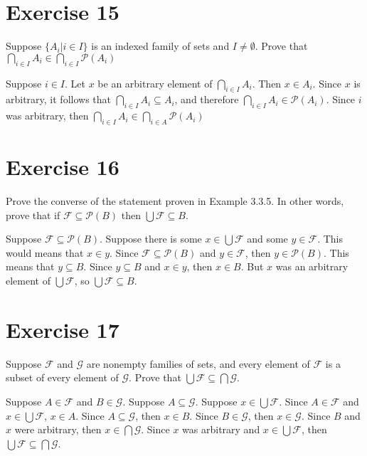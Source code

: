 \documentclass[11pt]{article}
\newcommand{\powerset}[1]{\mathscr{P}(#1)}
\newcommand{\family}[1]{\mathcal{#1}}
\begin{document}
\section*{Exercise 15}

Suppose $\{A_i | i \in I\}$ is an indexed family of sets and $I \neq \emptyset$.
Prove that $\bigcap_{i \in I} A_i \in \bigcap_{i \in I} \powerset{A_i}$

Suppose $i \in I$. Let $x$ be an arbitrary element of $\bigcap_{i \in I} A_i$.
Then $x \in A_i$. Since $x$ is arbitrary, it follows that 
$\bigcap_{i \in I} A_i \subseteq A_i$, and therefore 
$\bigcap_{i \in I} A_i \in \powerset{A_i}$. Since $i$ was arbitrary, then 
$\bigcap_{i \in I} A_i \in \bigcap_{i \in A} \powerset{A_i}$

\section*{Exercise 16}

Prove the converse of the statement proven in Example 3.3.5. In other words, 
prove that if $\family{F} \subseteq \powerset{B}$ then 
$\bigcup \family{F} \subseteq B$.

Suppose $\family{F} \subseteq \powerset{B}$. Suppose there is some 
$x \in \bigcup \family{F}$ and some $y \in \family{F}$. This would means that 
$x \in y$. Since $\family{F} \subseteq \powerset{B}$ and $y \in \family{F}$, 
then $y \in \powerset{B}$. This means that $y \subseteq B$. Since 
$y \subseteq B$ and $x \in y$, then $x \in B$. But $x$ was an arbitrary element
of $\bigcup \family{F}$, so $\bigcup \family{F} \subseteq B$.

\section*{Exercise 17}

Suppose $\family{F}$ and $\family{G}$ are nonempty families of sets, and every 
element of $\family{F}$ is a subset of every element of $\family{G}$. 
Prove that $\bigcup \family{F} \subseteq \bigcap \family{G}$.

Suppose $A \in \family{F}$ and $B \in \family{G}$. Suppose 
$A \subseteq \family{G}$. Suppose $x \in \bigcup \family{F}$. Since 
$A \in \family{F}$ and $x \in \bigcup \family{F}$, $x \in A$. Since 
$A \subseteq \family{G}$, then $x \in B$. Since $B \in \family{G}$, then 
$x \in \family{G}$. Since $B$ and $x$ were arbitrary, then 
$x \in \bigcap \family{G}$. Since $x$ was arbitrary and 
$x \in \bigcup \family{F}$, then 
$\bigcup \family{F} \subseteq \bigcap \family{G}$.
\end{document}
